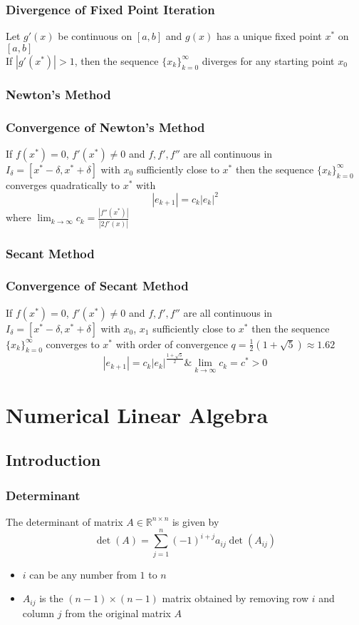 \documentclass[11pt]{article}
\newcommand{\R}{{\mathbb{R}}}
\newcommand{\ds}{\displaystyle}
\begin{document}
\subsubsection*{Divergence of Fixed Point Iteration}
Let $g'(x)$ be continuous on $[a,b]$ and $g(x)$ has a unique fixed point $x^*$ on $[a,b]$ \\
If $|g'(x^*)|>1$, then the sequence $\{x_k\}^\infty_{k=0}$ diverges for any starting point $x_0$
\subsubsection{Newton's Method}
\subsubsection*{Convergence of Newton's Method}
If $f(x^*)=0$, $f'(x^*)\neq0$ and $f, f', f''$ are all continuous in $I_\delta=[x^*-\delta, x^*+\delta]$ with $x_0$ sufficiently close to $x^*$ then the sequence $\{x_k\}^\infty_{k=0}$ converges quadratically to $x^*$ with \[|e_{k+1}| = c_k|e_k|^2\]
where $\ds\lim_{k\to\infty}c_k = \frac{|f''(x^*)|}{|2f'(x)|}$
\subsubsection{Secant Method}
\subsubsection*{Convergence of Secant Method}
If $f(x^*)=0$, $f'(x^*)\neq0$ and $f,f',f''$ are all continuous in $I_\delta = [x^*-\delta,x^*+\delta]$ with $x_0$, $x_1$ sufficiently close to $x^*$ then the sequence $\{x_k\}^\infty_{k=0}$ converges to $x^*$ with order of convergence $q=\ds\frac{1}{2}(1+\sqrt{5})\approx1.62$
\[|e_{k+1}| = c_k|e_k|^{\frac{1+\sqrt{5}}{2}}\& \lim_{k\to\infty}c_k = c^* > 0\]

\section{Numerical Linear Algebra}
\subsection{Introduction}
\subsubsection{Determinant}
The determinant of matrix $A\in\R^{n\times n}$ is given by \[\det(A) = \sum_{j=1}^{n}(-1)^{i+j}a_{ij}\det(A_{ij})\]
\begin{itemize}
  \item $i$ can be any number from $1$ to $n$
  \item $A_{ij}$ is the $(n-1)\times(n-1)$ matrix obtained by removing row $i$ and column $j$ from the original matrix $A$
\end{itemize}
\end{document}
